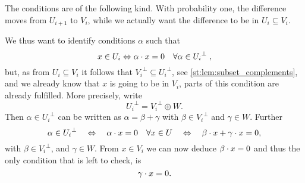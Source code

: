 The conditions are of the following kind.
With probability one, the difference moves from $U_{i+1}$ to $V_i$, while we actually want the difference to be in $U_{i} \subseteq V_{i}$.
%

We thus want to identify conditions $\alpha$ such that
\begin{equation*}
    x \in U_i \Leftrightarrow \alpha \cdot x = 0 \quad \forall \alpha \in {U_i}^\perp\;,
\end{equation*}
but, as from $U_i \subseteq V_i$ it follows that ${V_i}^\perp \subseteq {U_i}^\perp$, see \cref{st:lem:subset_complements}, and we already know that $x$ is going to be in $V_i$, parts of this condition are already fulfilled.
More precisely, write
\begin{equation*}
    {U_i}^\perp = {V_i}^\perp \oplus W.
\end{equation*}
Then $\alpha \in {U_i}^\perp$ can be written as $\alpha = \beta + \gamma$ with $\beta \in {V_i}^\perp$ and $\gamma \in W$.
Further
\begin{equation*}
    \alpha \in {U_i}^\perp
    \quad \Leftrightarrow \quad
    \alpha \cdot x = 0 \quad \forall x \in U
    \quad \Leftrightarrow \quad
    \beta \cdot x + \gamma \cdot x = 0,
\end{equation*}
with $\beta \in {V_i}^\perp$, and $\gamma \in W$.
From $x \in V_i$ we can now deduce $\beta \cdot x = 0$ and thus the only condition that is left to check, is
\begin{equation*}
    \gamma \cdot x = 0.
\end{equation*}

